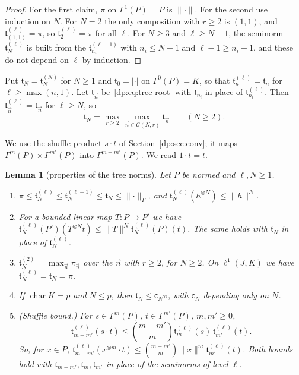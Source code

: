 \documentclass[11pt]{amsart}
\newtheorem{lemma}[theorem]{Lemma}
\theoremstyle{definition}
\theoremstyle{remark}
\numberwithin{equation}{section}
\newcommand{\abs}[1]{\lvert #1\rvert}
\newcommand{\norm}[1]{\lVert #1\rVert}
\theoremstyle{plain}
\theoremstyle{definition}
\theoremstyle{plain}
\begin{document}
\begin{proof}
For the first claim, $\pi$ on $\Gamma^1(P)=P$ is $\norm\cdot$. For the second use induction on $N$. For $N=2$ the only composition with $r\ge2$ is $(1,1)$, and $\mathfrak t^{(\ell)}_{(1,1)}=\pi$, so $\mathfrak t^{(\ell)}_2=\pi$ for all $\ell$. For $N\ge3$ and $\ell\ge N-1$, the seminorm $\mathfrak t^{(\ell)}_N$ is built from the $\mathfrak t^{(\ell-1)}_{n_i}$ with $n_i\le N-1$ and $\ell-1\ge n_i-1$, and these do not depend on $\ell$ by induction.
\end{proof}

Put $\mathfrak t_N=\mathfrak t^{(N)}_N$ for $N\ge1$ and $\mathfrak t_0=\abs\cdot$ on $\Gamma^0(P)=K$, so that $\mathfrak t^{(\ell)}_n=\mathfrak t_n$ for $\ell\ge\max(n,1)$. Let $\mathfrak t_{\vec n}$ be~\eqref{dp:eq:tree-root} with $\mathfrak t_{n_i}$ in place of $\mathfrak t^{(\ell)}_{n_i}$. Then $\mathfrak t^{(\ell)}_{\vec n}=\mathfrak t_{\vec n}$ for $\ell\ge N$, so
\begin{equation}\label{dp:eq:tree-fixed}
 \mathfrak t_N=\max_{r\ge2}\max_{\vec n\in\mathcal C(N,r)}\mathfrak t_{\vec n}\qquad(N\ge2).
\end{equation}

We use the shuffle product $s\cdot t$ of Section~\ref{dp:sec:conv}; it maps $\Gamma^m(P)\times\Gamma^{m'}(P)$ into $\Gamma^{m+m'}(P)$. We read $1\cdot t=t$.

\begin{lemma}[properties of the tree norms]\label{dp:lem:tree}
Let $P$ be normed and $\ell,N\ge1$.
\begin{enumerate}
\item $\pi\le\mathfrak t^{(\ell)}_N\le\mathfrak t^{(\ell+1)}_N\le\mathfrak t_N\le\norm\cdot_\Gamma$, and $\mathfrak t^{(\ell)}_N(h^{\otimes N})\le\norm h^N$.
\item For a bounded linear map $T\colon P\to P'$ we have $\mathfrak t^{(\ell)}_N(P')(T^{\otimes N}t)\le\norm T^N\mathfrak t^{(\ell)}_N(P)(t)$. The same holds with $\mathfrak t_N$ in place of $\mathfrak t^{(\ell)}_N$.
\item $\mathfrak t^{(2)}_N=\max_{\vec n}\pi_{\vec n}$ over the $\vec n$ with $r\ge2$, for $N\ge2$. On $\ell^1(J,K)$ we have $\mathfrak t^{(\ell)}_N=\mathfrak t_N=\pi$.
\item If $\operatorname{char}K=p$ and $N\le p$, then $\mathfrak t_N\le\mathsf c_N\pi$, with $\mathsf c_N$ depending only on $N$.
\item \textup{(Shuffle bound.)} For $s\in\Gamma^m(P)$, $t\in\Gamma^{m'}(P)$, $m,m'\ge0$,
\begin{equation}\label{dp:eq:shuffle}
 \mathfrak t^{(\ell)}_{m+m'}(s\cdot t)\le\binom{m+m'}m\mathfrak t^{(\ell)}_m(s)\,\mathfrak t^{(\ell)}_{m'}(t).
\end{equation}
So, for $x\in P$, $\mathfrak t^{(\ell)}_{m+m'}(x^{\otimes m}\cdot t)\le\binom{m+m'}m\norm x^m\mathfrak t^{(\ell)}_{m'}(t)$. Both bounds hold with $\mathfrak t_{m+m'},\mathfrak t_m,\mathfrak t_{m'}$ in place of the seminorms of level $\ell$.
\end{enumerate}
\end{lemma}
\end{document}
